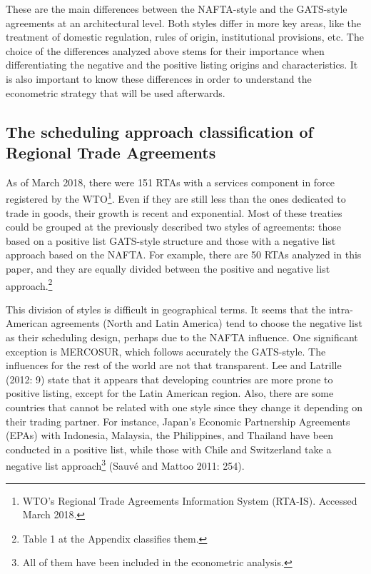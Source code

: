 \documentclass{article}
\begin{document}
\smallskip

These are the main differences between the NAFTA-style and the GATS-style agreements at an architectural level. Both styles differ in more key areas, like the treatment of domestic regulation, rules of origin, institutional provisions, etc. The choice of the differences analyzed above stems for their importance when differentiating the negative and the positive listing origins and characteristics. It is also important to know these differences in order to understand the econometric strategy that will be used afterwards.

\subsection{The scheduling approach classification of Regional Trade Agreements}

As of March 2018, there were 151 RTAs with a services component in force registered by the WTO\footnote{WTO’s Regional Trade Agreements Information System (RTA-IS). Accessed March 2018.}. Even if they are still less than the ones dedicated to trade in goods, their growth is recent and exponential. Most of these treaties could be grouped at the previously described two styles of agreements: those based on a positive list GATS-style structure and those with a negative list approach based on the NAFTA. For example, there are 50 RTAs analyzed in this paper, and they are equally divided between the positive and negative list approach.\footnote{Table 1 at the Appendix classifies them.}

\smallskip

This division of styles is difficult in geographical terms. It seems that the intra-American agreements (North and Latin America) tend to choose the negative list as their scheduling design, perhaps due to the NAFTA influence. One significant exception is MERCOSUR, which follows accurately the GATS-style. The influences for the rest of the world are not that transparent. Lee and Latrille (2012: 9) state that it appears that developing countries are more prone to positive listing, except for the Latin American region. Also, there are some countries that cannot be related with one style since they change it depending on their trading partner. For instance, Japan’s Economic Partnership Agreements (EPAs) with Indonesia, Malaysia, the Philippines, and Thailand have been conducted in a positive list, while those with Chile and Switzerland take a negative list approach\footnote{All of them have been included in the econometric analysis.} (Sauvé and Mattoo 2011: 254).
\end{document}
